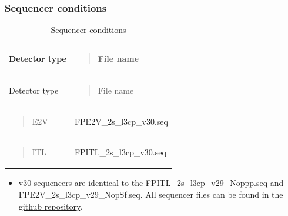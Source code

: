 \subsubsection{Sequencer conditions}\label{sequencer-conditions}

\begin{longtable}[]{@{}
  >{\raggedright\arraybackslash}p{}
  >{\raggedright\arraybackslash}p{}@{}}
\caption{Sequencer conditions}\tabularnewline
\toprule\noalign{}
\begin{minipage}[b]{\linewidth}\raggedright
Detector type
\end{minipage} & \begin{minipage}[b]{\linewidth}\raggedright
\begin{quote}
File name
\end{quote}
\end{minipage} \\
\midrule\noalign{}
\endfirsthead
\toprule\noalign{}
\begin{minipage}[b]{\linewidth}\raggedright
Detector type
\end{minipage} & \begin{minipage}[b]{\linewidth}\raggedright
\begin{quote}
File name
\end{quote}
\end{minipage} \\
\midrule\noalign{}
\endhead
\bottomrule\noalign{}
\endlastfoot
\begin{minipage}[t]{\linewidth}\raggedright
\begin{quote}
E2V
\end{quote}
\end{minipage} &
FP\label{e2v_2s_l3cp_v30.seq}{E2V\_2s\_l3cp\_v30.seq} \\
\begin{minipage}[t]{\linewidth}\raggedright
\begin{quote}
ITL
\end{quote}
\end{minipage} &
FP\label{itl_2s_l3cp_v30.seq}{ITL\_2s\_l3cp\_v30.seq} \\
\end{longtable}

\begin{itemize}
\tightlist
\item
  v30 sequencers are identical to the
  FP\label{itl_2s_l3cp_v29_noppp.seq}{ITL\_2s\_l3cp\_v29\_Noppp.seq}
  and
  FP\label{e2v_2s_l3cp_v29_nopsf.seq}{E2V\_2s\_l3cp\_v29\_NopSf.seq}.
  All sequencer files can be found in the
  \href{https://github.com/lsst-camera-dh/sequencer-files/tree/master/run7}{github
  repository}.
\end{itemize}

